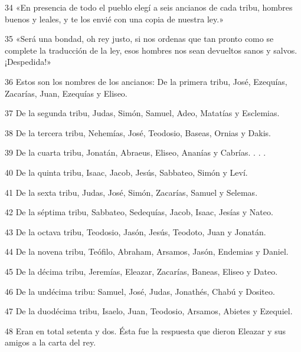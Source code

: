 \par 34 «En presencia de todo el pueblo elegí a seis ancianos de cada tribu, hombres buenos y leales, y te los envié con una copia de nuestra ley.»

\par 35 «Será una bondad, oh rey justo, si nos ordenas que tan pronto como se complete la traducción de la ley, esos hombres nos sean devueltos sanos y salvos. ¡Despedida!»

\par 36 Estos son los nombres de los ancianos: De la primera tribu, José, Ezequías, Zacarías, Juan, Ezequías y Eliseo.

\par 37 De la segunda tribu, Judas, Simón, Samuel, Adeo, Matatías y Esclemias.

\par 38 De la tercera tribu, Nehemías, José, Teodosio, Baseas, Ornias y Dakis.

\par 39 De la cuarta tribu, Jonatán, Abraeus, Eliseo, Ananías y Cabrías. . . .

\par 40 De la quinta tribu, Isaac, Jacob, Jesús, Sabbateo, Simón y Leví.

\par 41 De la sexta tribu, Judas, José, Simón, Zacarías, Samuel y Selemas.

\par 42 De la séptima tribu, Sabbateo, Sedequías, Jacob, Isaac, Jesías y Nateo.

\par 43 De la octava tribu, Teodosio, Jasón, Jesús, Teodoto, Juan y Jonatán.

\par 44 De la novena tribu, Teófilo, Abraham, Arsamos, Jasón, Endemias y Daniel.

\par 45 De la décima tribu, Jeremías, Eleazar, Zacarías, Baneas, Eliseo y Dateo.

\par 46 De la undécima tribu: Samuel, José, Judas, Jonathés, Chabú y Dositeo.

\par 47 De la duodécima tribu, Isaelo, Juan, Teodosio, Arsamos, Abietes y Ezequiel.

\par 48 Eran en total setenta y dos. Ésta fue la respuesta que dieron Eleazar y sus amigos a la carta del rey.

